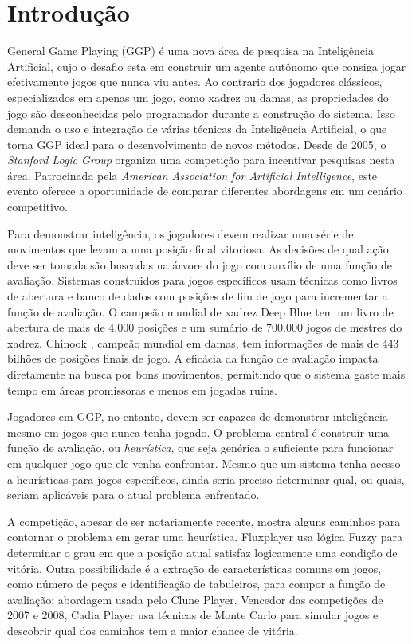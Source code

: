 \chapter{Introdução}
\label{intro}

General Game Playing (GGP) é uma nova área de pesquisa na Inteligência Artificial, cujo o desafio esta em construir um agente autônomo que consiga jogar efetivamente jogos que nunca viu antes. Ao contrario dos jogadores clássicos, especializados em apenas um jogo, como xadrez ou damas, as propriedades do jogo são desconhecidas pelo programador durante a construção do sistema. Isso demanda o uso e integração de várias técnicas da Inteligência Artificial, o que torna GGP ideal para o desenvolvimento de novos métodos. Desde de 2005, o \textit{Stanford Logic Group} organiza uma competição para incentivar pesquisas nesta área. Patrocinada pela \textit{American Association for Artificial Intelligence}, este evento oferece a oportunidade de comparar diferentes abordagens em um cenário competitivo.  

Para demonstrar inteligência, os jogadores devem realizar uma série de movimentos que levam a uma posição final vitoriosa. As decisões de qual ação deve ser tomada são buscadas na árvore do jogo com auxílio de uma função de avaliação. Sistemas construidos para jogos específicos usam técnicas como livros de abertura e banco de dados com posições de fim de jogo para incrementar a função de avaliação. O campeão mundial de xadrez Deep Blue \cite{dblue} tem um livro de abertura de mais de 4.000 posições e um sumário de 700.000 jogos de mestres do xadrez. 
Chinook \cite{chinook}, campeão mundial em damas, tem informações de mais de 443 bilhões de posições finais de jogo. A eficácia da função de avaliação impacta diretamente na busca por bons movimentos, permitindo que o sistema gaste mais tempo em áreas promissoras e menos em jogadas ruins.

Jogadores em GGP, no entanto, devem ser capazes de demonstrar inteligência mesmo em jogos que nunca tenha jogado. O problema central é construir uma função de avaliação, ou \textit{heurística}, que seja genérica o suficiente para funcionar em qualquer jogo que ele venha confrontar. Mesmo que um sistema tenha acesso a heurísticas para jogos específicos, ainda seria preciso determinar qual, ou quais, seriam aplicáveis para o atual problema enfrentado.

A competição, apesar de ser notariamente recente, mostra alguns caminhos para contornar o problema em gerar uma heurística. Fluxplayer usa lógica Fuzzy para determinar o grau em que a posição atual satisfaz logicamente uma condição de vitória. Outra possibilidade é a extração de características comuns em jogos, como número de peças e identificação de tabuleiros, para compor a função de avaliação; abordagem usada pelo Clune Player. Vencedor das competições de 2007 e 2008, Cadia Player usa técnicas de Monte Carlo para simular jogos e descobrir qual dos caminhos tem a maior chance de vitória.

